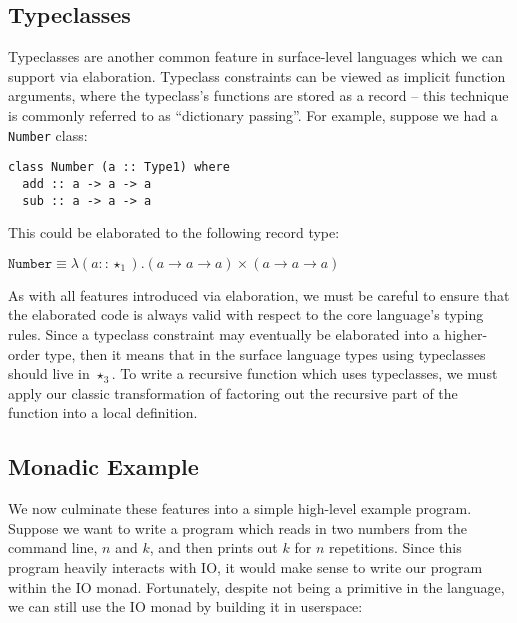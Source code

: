 \documentclass[runningheads]{llncs}
\begin{document}


\subsection{Typeclasses} \label{sec:typeclasses}

Typeclasses are another common feature in surface-level languages which we can support via elaboration. Typeclass constraints can be viewed as implicit function arguments, where the typeclass's functions are stored as a record -- this technique is commonly referred to as ``dictionary passing''. For example, suppose we had a \texttt{Number} class:

\begin{verbatim}
class Number (a :: Type1) where
  add :: a -> a -> a
  sub :: a -> a -> a
\end{verbatim}

This could be elaborated to the following record type:

$\texttt{Number} \equiv \lambda (a :: \star_1). (a \rightarrow a \rightarrow a) \times (a \rightarrow a \rightarrow a)$

As with all features introduced via elaboration, we must be careful to ensure that the elaborated code is always valid with respect to the core language's typing rules. Since a typeclass constraint may eventually be elaborated into a higher-order type, then it means that in the surface language types using typeclasses should live in $\star_3$. To write a recursive function which uses typeclasses, we must apply our classic transformation of factoring out the recursive part of the function into a local definition.



\subsection{Monadic Example} \label{sec:example}

We now culminate these features into a simple high-level example program. Suppose we want to write a program which reads in two numbers from the command line, $n$ and $k$, and then prints out $k$ for $n$ repetitions. Since this program heavily interacts with IO, it would make sense to write our program within the IO monad. Fortunately, despite not being a primitive in the language, we can still use the IO monad by building it in userspace:
\end{document}
